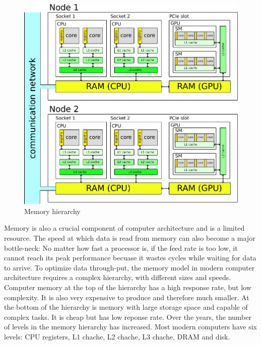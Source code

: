 \begin{figure}
\centering
\includegraphics[scale=1.0]{Pics/memory}
\caption{Memory hierarchy}
\label{clusterArchitecture}
\end{figure}

Memory is also a crucial component of computer architecture and is a limited resource. The speed at which data is read from memory can also become a major bottle-neck: No matter how fast a processor is, if the feed rate is too low, it cannot reach its peak performance becuase it wastes cycles while waiting for data to arrive. To optimize data through-put, the memory model in modern computer architecture requires a complex hierarchy, with different sizes and speeds. Computer memory at the top of the hierarchy has a high response rate, but low complexity. It is also very expensive to produce and therefore much smaller. At the bottom of the hierarchy is memory with large storage space and capable of complex tasks. It is cheap but has low reponse rate. Over the years, the number of levels in the memory hierarchy has increased. Most modern computers have six levels: CPU registers, L1 chache, L2 chache, L3 chache, DRAM and disk. 


